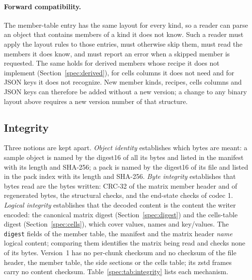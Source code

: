 \paragraph{Forward compatibility.}
The member-table entry has the same layout for every kind, so a reader can parse an object that contains members of a
kind it does not know. Such a reader must apply the layout rules to those entries, must otherwise skip them, must read
the members it does know, and must report an error when a skipped member is requested. The same holds for derived
members whose recipe it does not implement (Section~\ref{spec:derived}), for cells columns it does not need and for
JSON keys it does not recognize. New member kinds, recipes, cells columns and JSON keys can therefore be added without
a new version; a change to any binary layout above requires a new version number of that structure.

\subsection{Integrity}
\label{spec:integrity}
Three notions are kept apart. \emph{Object identity} establishes which bytes are meant: a sample object is named by the
digest16 of all its bytes and listed in the manifest with its length and SHA-256; a pack is named by the digest16 of
its file and listed in the pack index with its length and SHA-256. \emph{Byte integrity} establishes that bytes read
are the bytes written: CRC-32 of the matrix member header and of regenerated bytes, the structural checks, and the
end-state checks of codec 1. \emph{Logical integrity} establishes that the decoded content is the content the writer
encoded: the canonical matrix digest (Section~\ref{spec:digest}) and the cells-table digest (Section~\ref{spec:cells}),
which cover values, names and key/values. The \texttt{digest} fields of the member table, the manifest and the matrix
header \emph{name} logical content; comparing them identifies the matrix being read and checks none of its bytes.
Version~1 has no per-chunk checksum and no checksum of the file header, the member table, the side sections or the
cells table; its zstd frames carry no content checksum. Table~\ref{spec:tab:integrity} lists each mechanism.

